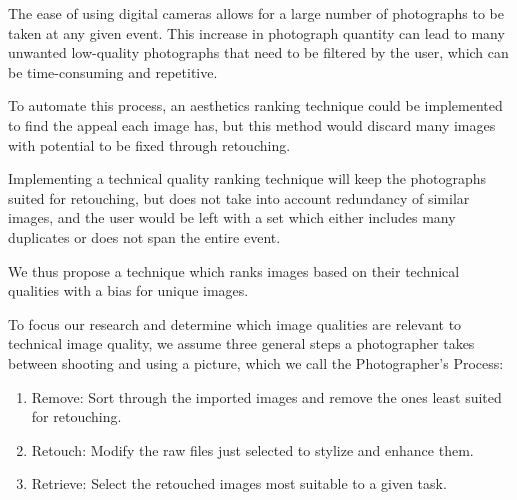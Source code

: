 \documentclass{sig-alternate}
\begin{document}
The ease of using digital cameras allows for a large number of photographs to be taken at any given event. This increase in photograph quantity can lead to many unwanted low-quality photographs that need to be filtered by the user, which can be time-consuming and repetitive.

To automate this process, an aesthetics ranking technique could be implemented to find the appeal each image has, but this method would discard many images with potential to be fixed through retouching.


Implementing a technical quality ranking technique will keep the photographs suited for retouching, but does not take into account redundancy of similar images, and the user would be left with a set which either includes many duplicates or does not span the entire event.


We thus propose a technique which ranks images based on their technical qualities with a bias for unique images.%

To focus our research and determine which image qualities are relevant to technical image quality, we assume three general steps a photographer takes between shooting and using a picture, which we call the Photographer's Process:
\begin{enumerate}
\item Remove: Sort through the imported images and remove the ones least suited for retouching.
\item Retouch: Modify the raw files just selected to stylize and enhance them.
\item Retrieve: Select the retouched images most suitable to a given task.
\end{enumerate}
\end{document}
